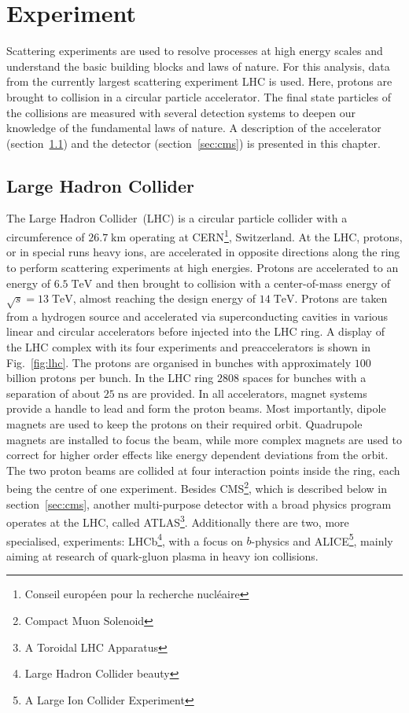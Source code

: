 \chapter{Experiment}
\label{ch:Exp}
	Scattering experiments are used to resolve processes at high energy scales and understand the basic building blocks and laws of nature. For this analysis, data from the currently largest scattering experiment LHC is used. Here, protons are brought to collision in a circular particle accelerator. The final state particles of the collisions are measured with several detection systems to deepen our knowledge of the fundamental laws of nature. A description of the accelerator (section~\ref{sec:lhc}) and the detector (section~\ref{sec:cms}) is presented in this chapter.
\section{Large Hadron Collider}
\label{sec:lhc}
	The Large Hadron Collider~(LHC) is a circular particle collider with a circumference of $26.7\;\text{km}$ operating at CERN\footnote{Conseil europ\'{e}en pour la recherche nucl\'{e}aire}, Switzerland. At the LHC, protons, or in special runs heavy ions, are accelerated in opposite directions along the ring to perform scattering experiments at high energies. Protons are accelerated to an energy of $6.5\;\text{TeV}$ and then brought to collision with a center-of-mass energy of $\sqrt{s}=13\;\text{TeV}$, almost reaching the design energy of $14\;\text{TeV}$. Protons are taken from a hydrogen source and accelerated via superconducting cavities in various linear and circular accelerators before injected into the LHC ring. A display of the LHC complex with its four experiments and preaccelerators is shown in Fig.~\ref{fig:lhc}. The protons are organised in bunches with approximately $100$ billion protons per bunch. In the LHC ring $2808$ spaces for bunches with a separation of about $25\;\text{ns}$ are provided. In all accelerators, magnet systems provide a handle to lead and form the proton beams. Most importantly, dipole magnets are used to keep the protons on their required orbit. Quadrupole magnets are installed to focus the beam, while more complex magnets are used to correct for higher order effects like energy dependent deviations from the orbit. The two proton beams are collided at four interaction points inside the ring, each being the centre of one experiment. Besides CMS\footnote{Compact Muon Solenoid}, which is described below in section~\ref{sec:cms},  another multi-purpose detector with a broad physics program operates at the LHC, called ATLAS\footnote{A Toroidal LHC Apparatus}. Additionally there are two, more specialised, experiments: LHCb\footnote{Large Hadron Collider beauty}, with a focus on $b$-physics and ALICE\footnote{A Large Ion Collider Experiment}, mainly aiming at research of quark-gluon plasma in heavy ion collisions. \\
